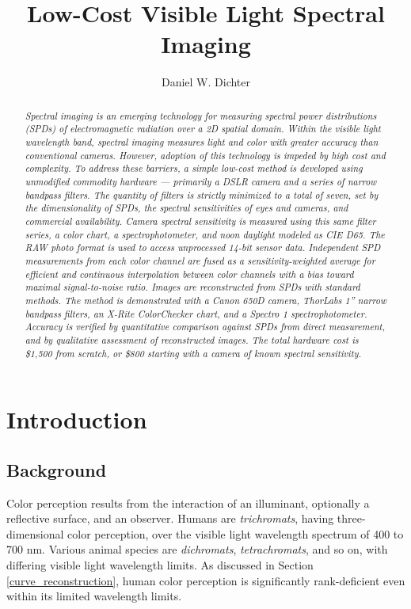 \documentclass[twocolumn,10pt]{asme2ej}
\title{Low-Cost Visible Light Spectral Imaging}
\author{Daniel W. Dichter
    \affiliation{
Independent Researcher\\
Cambridge, Massachusetts, U.S.A.\\
daniel.w.dichter@gmail.com
    }	
}
\begin{document}
\maketitle

\begin{abstract}{\it Spectral imaging is an emerging technology for measuring spectral power distributions (SPDs) of electromagnetic radiation over a 2D spatial domain. Within the visible light wavelength band, spectral imaging measures light and color with greater accuracy than conventional cameras. However, adoption of this technology is impeded by high cost and complexity. To address these barriers, a simple low-cost method is developed using unmodified commodity hardware --- primarily a DSLR camera and a series of narrow bandpass filters. The quantity of filters is strictly minimized to a total of seven, set by the dimensionality of SPDs, the spectral sensitivities of eyes and cameras, and commercial availability. Camera spectral sensitivity is measured using this same filter series, a color chart, a spectrophotometer, and noon daylight modeled as CIE D65. The RAW photo format is used to access unprocessed 14-bit sensor data. Independent SPD measurements from each color channel are fused as a sensitivity-weighted average for efficient and continuous interpolation between color channels with a bias toward maximal signal-to-noise ratio. Images are reconstructed from SPDs with standard methods. The method is demonstrated with a Canon 650D camera, ThorLabs 1'' narrow bandpass filters, an X-Rite ColorChecker chart, and a Spectro 1 spectrophotometer. Accuracy is verified by quantitative comparison against SPDs from direct measurement, and by qualitative assessment of reconstructed images. The total hardware cost is \$1,500 from scratch, or \$800 starting with a camera of known spectral sensitivity.
}
\end{abstract}

\section{Introduction}

\subsection{Background}


Color perception results from the interaction of an illuminant, optionally a reflective surface, and an observer. Humans are \textit{trichromats}, having three-dimensional color perception, over the visible light wavelength spectrum of 400 to 700 nm. Various animal species are \textit{dichromats}, \textit{tetrachromats}, and so on, with differing visible light wavelength limits. As discussed in Section \ref{curve_reconstruction}, human color perception is significantly rank-deficient even within its limited wavelength limits.
\end{document}
